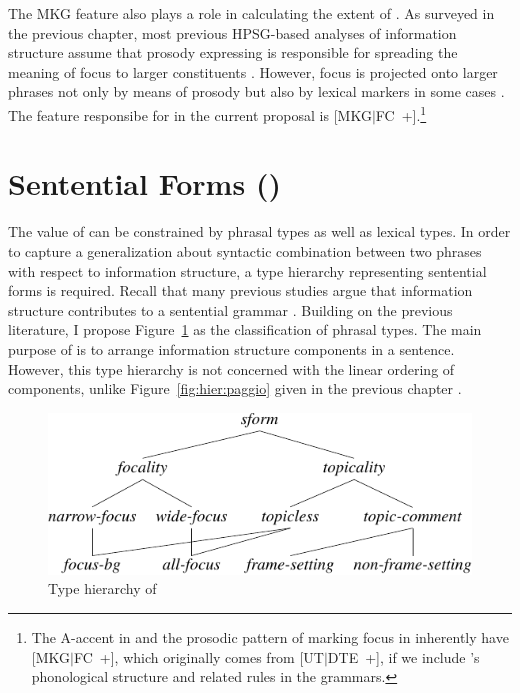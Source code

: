 The MKG feature also plays a role in calculating the extent of . As surveyed in the previous chapter, most
previous HPSG-based analyses of information structure assume that
prosody expressing  is responsible for spreading the meaning of
focus to larger constituents \citep[among many
  others]{bildhauer:07}. However, focus is projected onto larger
phrases not only by means of prosody but also by lexical markers in
some cases \citep{choe:02}. The feature responsibe
for  in the current proposal is
\mbox{[MKG{$\mid$}FC +]}.\footnote{The A-accent in  and
  the prosodic pattern of marking focus in  inherently
  have \mbox{[MKG{$\mid$}FC +]}, which originally comes from
  \mbox{[UT{$\mid$}DTE +]}, if we include \citet{bildhauer:07}'s
  phonological structure and related rules in the
  grammars.}






 




\section{Sentential Forms \textnormal{(}\textnormal{)}}
\label{9:ssec:sform}


The value of  can be constrained by phrasal types as well
as lexical types. In order to
capture a generalization about syntactic combination between two
phrases with respect to information structure, a type hierarchy
representing sentential forms is required. Recall that many previous
studies argue that information structure contributes to a sentential
grammar
\citep{lambrecht:96,engdahl:vallduvi:96,paggio:09,song:bender:11}.
Building on the previous literature, I propose Figure~\ref{fig:sform}
as the classification of phrasal types. The main purpose of
 is to arrange information structure components in a
sentence. However, this type hierarchy is not
concerned with the linear ordering of components, unlike
Figure~\ref{fig:hier:paggio} given in the previous
chapter .



\begin{figure}[!t]
\begin{center} 
\includegraphics{pdf/sform.pdf}
\caption{Type hierarchy of }
\label{fig:sform}
\end{center}
\end{figure}


